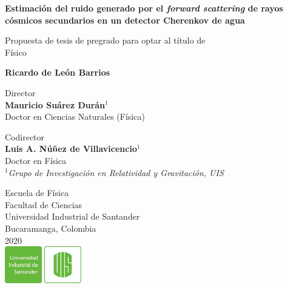 \documentclass[12pt]{report}
\begin{document}
\begin{titlepage}
   \begin{center}
       \vspace*{1cm}
       
       
       \large
       \textbf{Estimación del ruido generado por el \textit{forward scattering} de rayos cósmicos secundarios en un detector Cherenkov de agua}
       
 
       \vspace{1.5cm}
 
       \small
       Propuesta de tesis de pregrado para optar al título de \\
       Físico
       
       
       \normalsize
       \textbf{Ricardo de León Barrios}
       
       \small
       \vspace{1cm}
       Director\\
       \textbf{Mauricio Suárez Durán}$^1$\\
       Doctor en Ciencias Naturales (Física)
       
       \vspace{1cm}
       Codirector\\
       \textbf{Luis A. Núñez de Villavicencio}$^1$\\
       Doctor en Física\\
       
       \vspace{1cm}
       $^1$\textit{Grupo de Investigación en Relatividad y Gravitación, UIS}
 
       \vfill
       
       
 
 
       
 
       \small
       Escuela de Física\\
       Facultad de Ciencias\\
       Universidad Industrial de Santander\\
       Bucaramanga, Colombia\\
       2020\\
       \vspace{0.3cm}
       \includegraphics[width=0.25\textwidth]{logo/logoUIS.png}
 
   \end{center}
\end{titlepage}
\end{document}
